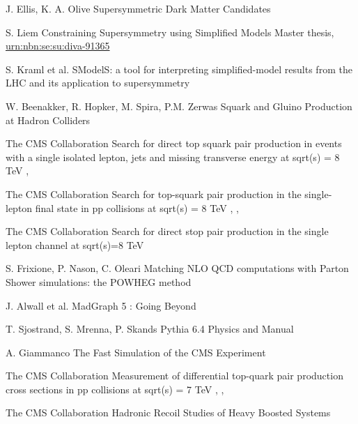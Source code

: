 {J. Ellis, K. A. Olive}
{Supersymmetric Dark Matter Candidates}
{}

{S. Liem}
{Constraining Supersymmetry using Simplified Models}
{Master thesis, \href{http://urn.kb.se/resolve?urn=urn\%3Anbn\%3Ase\%3Asu\%3Adiva-91365}{urn:nbn:se:su:diva-91365}}

{S. Kraml et al.}
{SModelS: a tool for interpreting simplified-model results from the LHC and its application to supersymmetry}
{}

{W. Beenakker, R. Hopker, M. Spira, P.M. Zerwas}
{Squark and Gluino Production at Hadron Colliders}
{}


{The CMS Collaboration}
{Search for direct top squark pair production in events with a single isolated lepton, jets and missing transverse energy at sqrt(s) = 8 TeV}
{, }

{The CMS Collaboration}
{Search for top-squark pair production in the single-lepton final state in pp collisions at sqrt(s) = 8 TeV}
{, , }

{The CMS Collaboration}
{Search for direct stop pair production in the single lepton channel at sqrt(s)=8 TeV}
{}


{S. Frixione, P. Nason, C. Oleari}
{Matching NLO QCD computations with Parton Shower simulations: the POWHEG method}
{}

{J. Alwall et al.}
{MadGraph 5 : Going Beyond}
{}

{T. Sjostrand, S. Mrenna, P. Skands}
{Pythia 6.4 Physics and Manual}
{}

{A. Giammanco}
{The Fast Simulation of the CMS Experiment}
{}

{The CMS Collaboration}
{Measurement of differential top-quark pair production
cross sections in pp collisions at sqrt(s) = 7 TeV}
{, , }

{The CMS Collaboration}
{Hadronic Recoil Studies of Heavy Boosted Systems}
{}

